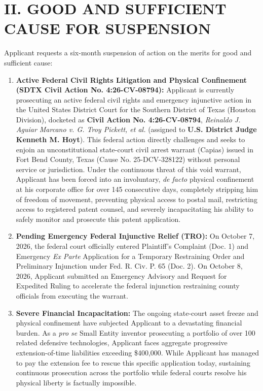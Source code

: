 \documentclass[11pt,letterpaper]{article}
\begin{document}
\section*{II. GOOD AND SUFFICIENT CAUSE FOR SUSPENSION}

Applicant requests a six-month suspension of action on the merits for good and sufficient cause:

\begin{enumerate}[leftmargin=2em, itemsep=3pt, parsep=0pt]
    \item \textbf{Active Federal Civil Rights Litigation and Physical Confinement (SDTX Civil Action No. 4:26-CV-08794):} Applicant is currently prosecuting an active federal civil rights and emergency injunctive action in the United States District Court for the Southern District of Texas (Houston Division), docketed as \textbf{Civil Action No. 4:26-CV-08794}, \textit{Reinaldo J. Aguiar Marcano v. G. Troy Pickett, et al.} (assigned to \textbf{U.S. District Judge Kenneth M. Hoyt}). This federal action directly challenges and seeks to enjoin an unconstitutional state-court civil arrest warrant (Capias) issued in Fort Bend County, Texas (Cause No. 25-DCV-328122) without personal service or jurisdiction. Under the continuous threat of this void warrant, Applicant has been forced into an involuntary, \textit{de facto} physical confinement at his corporate office for over 145 consecutive days, completely stripping him of freedom of movement, preventing physical access to postal mail, restricting access to registered patent counsel, and severely incapacitating his ability to safely monitor and prosecute this patent application.
    \item \textbf{Pending Emergency Federal Injunctive Relief (TRO):} On October 7, 2026, the federal court officially entered Plaintiff's Complaint (Doc. 1) and Emergency \textit{Ex Parte} Application for a Temporary Restraining Order and Preliminary Injunction under Fed. R. Civ. P. 65 (Doc. 2). On October 8, 2026, Applicant submitted an Emergency Advisory and Request for Expedited Ruling to accelerate the federal injunction restraining county officials from executing the warrant.
    \item \textbf{Severe Financial Incapacitation:} The ongoing state-court asset freeze and physical confinement have subjected Applicant to a devastating financial burden. As a \textit{pro se} Small Entity inventor prosecuting a portfolio of over 100 related defensive technologies, Applicant faces aggregate progressive extension-of-time liabilities exceeding \$400,000. While Applicant has managed to pay the extension fee to rescue this specific application today, sustaining continuous prosecution across the portfolio while federal courts resolve his physical liberty is factually impossible.
\end{enumerate}
\end{document}
